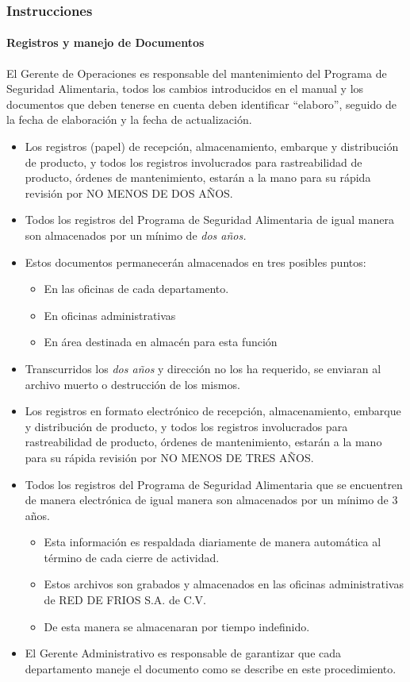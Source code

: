\subsubsection{Instrucciones}

\paragraph{Registros y manejo de Documentos}

El Gerente de Operaciones es responsable del mantenimiento del Programa de Seguridad Alimentaria, todos los cambios introducidos en el manual y los documentos que deben tenerse en cuenta deben identificar “elaboro”, seguido de la fecha de elaboración y la fecha de actualización.

\begin{itemize}
	\item Los registros (papel) de recepción, almacenamiento, embarque y distribución de producto, y todos los registros involucrados para rastreabilidad de producto, órdenes de mantenimiento, estarán a la mano para su rápida revisión por NO MENOS DE DOS AÑOS.
	\item Todos los registros del Programa de Seguridad Alimentaria de igual manera son almacenados por un mínimo de \emph{dos años.}
	\item Estos documentos permanecerán almacenados en tres posibles puntos:
	\begin{itemize}
		\item En las oficinas de cada departamento.
		\item En oficinas administrativas
		\item En área destinada en almacén para esta función
	\end{itemize}
	\item Transcurridos los \emph{dos años} y dirección no los ha requerido, se enviaran al archivo muerto o destrucción de los mismos.
	\item Los registros en formato electrónico de recepción, almacenamiento, embarque y distribución de producto, y todos los registros involucrados para rastreabilidad de producto, órdenes de mantenimiento, estarán a la mano para su rápida revisión por NO MENOS DE TRES AÑOS.
	\item Todos los registros del Programa de Seguridad Alimentaria que se encuentren de manera electrónica de igual manera son almacenados por un mínimo de 3 años.
	\begin{itemize}
		\item Esta información es respaldada diariamente de manera automática al término de cada cierre de actividad.
		\item Estos archivos son grabados y almacenados en las oficinas administrativas de RED DE FRIOS S.A. de C.V.
		\item De esta manera se almacenaran por tiempo indefinido.
	\end{itemize}
	\item El Gerente Administrativo es responsable de garantizar que cada departamento maneje el documento como se describe en este procedimiento.
\end{itemize}

